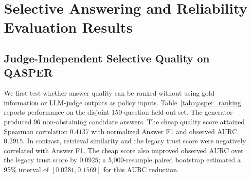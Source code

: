 \documentclass[smallextended]{svjour3}
\begin{document}
\begin{table}[htbp]
\centering
\caption{Selective-policy configuration for QASPER}
\label{tab:exp_setup}
\renewcommand{\arraystretch}{1.2}
\end{table}

\section{Selective Answering and Reliability Evaluation Results}
\label{sec:results}

\subsection{Judge-Independent Selective Quality on QASPER}
\label{subsec:qasper_results}

We first test whether answer quality can be ranked without using gold information or LLM-judge outputs as policy inputs. Table~\ref{tab:qasper_ranking} reports performance on the disjoint 150-question held-out set. The generator produced 96 non-abstaining candidate answers. The cheap quality score attained Spearman correlation $0.4137$ with normalized Answer F1 and observed AURC $0.2915$. In contrast, retrieval similarity and the legacy trust score were negatively correlated with Answer F1. The cheap score also improved observed AURC over the legacy trust score by $0.0925$; a 5,000-resample paired bootstrap estimated a 95\% interval of $[0.0281,0.1569]$ for this AURC reduction.
\end{document}
